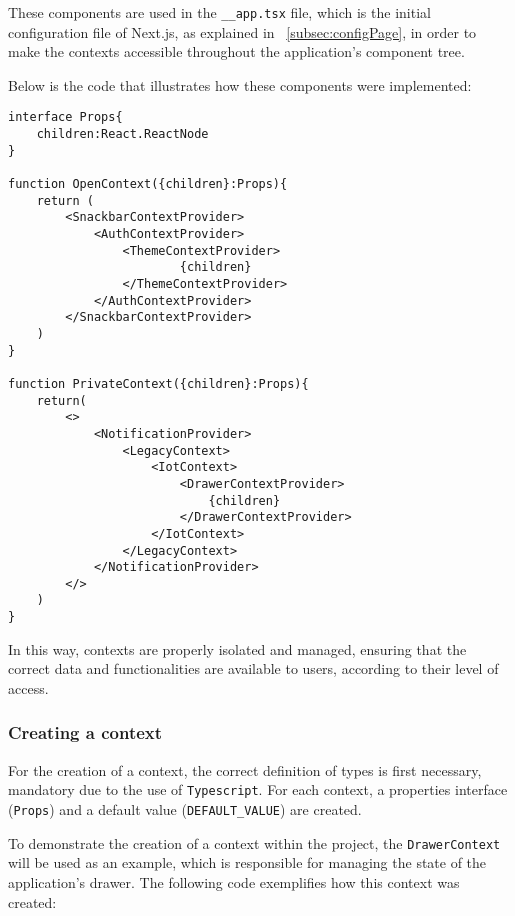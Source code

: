 These components are used in the \texttt{\_\_app.tsx} file, which is the initial configuration file of Next.js, as explained in ~\ref{subsec:configPage}, in order to make the contexts accessible throughout the application's component tree.

Below is the code that illustrates how these components were implemented:

\begin{verbatim}
interface Props{
    children:React.ReactNode
}

function OpenContext({children}:Props){
    return (
        <SnackbarContextProvider>
            <AuthContextProvider>
                <ThemeContextProvider>
                        {children}
                </ThemeContextProvider>
            </AuthContextProvider>
        </SnackbarContextProvider>
    )
}

function PrivateContext({children}:Props){
    return(
        <>
            <NotificationProvider>
                <LegacyContext>
                    <IotContext>
                        <DrawerContextProvider>
                            {children}
                        </DrawerContextProvider>
                    </IotContext>
                </LegacyContext>
            </NotificationProvider>
        </> 
    )
}
\end{verbatim}

In this way, contexts are properly isolated and managed, ensuring that the correct data and functionalities are available to users, according to their level of access.


\subsubsection{Creating a context}\label{subsubsec:contextCreation}
For the creation of a context, the correct definition of types is first necessary, mandatory due to the use of \texttt{Typescript}. For each context, a properties interface (\texttt{Props}) and a default value (\texttt{DEFAULT\_VALUE}) are created.

To demonstrate the creation of a context within the project, the \texttt{DrawerContext} will be used as an example, which is responsible for managing the state of the application's drawer. The following code exemplifies how this context was created:

